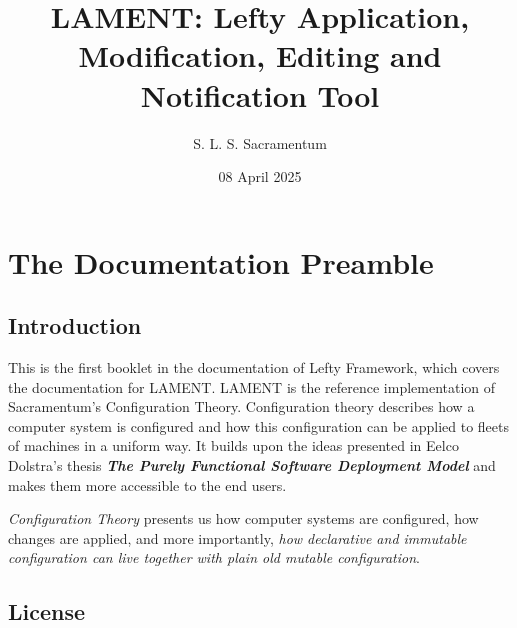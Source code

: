 \documentclass{book}
\title{LAMENT: Lefty Application, Modification, Editing and Notification Tool}
\author{S. L. S. Sacramentum}
\date{08 April 2025}
\begin{document}
    \maketitle
    \tableofcontents
    \chapter{The Documentation Preamble}
    \section{Introduction}
    This is the first booklet in the documentation of Lefty Framework, which covers the documentation for LAMENT.
    LAMENT is the reference implementation of Sacramentum's Configuration Theory. Configuration theory describes
    how a computer system is configured and how this configuration can be applied to fleets of machines in a
    uniform way. It builds upon the ideas presented in Eelco Dolstra's thesis \textbf{\textit{The Purely Functional Software Deployment Model}} and
    makes them more accessible to the end users.

    \textit{Configuration Theory} presents us how computer systems are configured, how changes are applied, and more importantly,
    \textit{how declarative and immutable configuration can live together with plain old mutable configuration}.
    \newpage
    \section{License}
    \newpage
    
    \newpage
    
    \newpage
\end{document}
